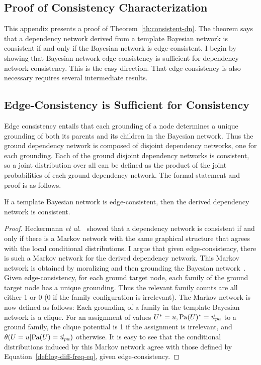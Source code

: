 \documentclass{sfuthesis}
\begin{document}
\begin{appendices} %
\chapter{ Proof of Consistency Characterization}

This appendix presents a proof of Theorem~\ref{th:consistent-dn}. The theorem says that a dependency network derived from a template Bayesian network is consistent if and only if the Bayesian network is edge-consistent. I  begin by showing that Bayesian network edge-consistency is sufficient for dependency network consistency. This is the easy direction. That edge-consistency is also necessary requires several intermediate results.

\section{Edge-Consistency is Sufficient for Consistency}

Edge consistency entails that each grounding of a node determines a unique grounding of both its parents and its children in the Bayesian network. Thus the ground dependency network is composed of disjoint dependency networks, one for each grounding. Each of the ground disjoint dependency networks is consistent, so a joint distribution over all can be defined as the product of the joint probabilities of each ground dependency network. The formal statement and proof is as follows.

\begin{proposition}
If a template Bayesian network is edge-consistent, then the derived dependency network is consistent.
\end{proposition}

\begin{proof} Heckermann {\em et al.}~\cite{Heckerman2000} showed that a dependency network is consistent if and only if there is a Markov network with the same graphical structure that agrees with the local conditional distributions. I  argue that given edge-consistency, there is such a Markov network for the derived dependency network. This Markov network  is obtained by moralizing and then grounding the Bayesian network~\cite{Domingos2009}. Given edge-consistency, for each ground target node, each family of the ground target node has a unique grounding. Thus the relevant family counts are all either 1 or 0 (0 if the family configuration is irrelevant). The Markov network is now defined as follows: Each grounding of a family in the template Bayesian network is a clique. For an assignment of values $\FG{\UT} = \UV,\FG{\Pa{\UT}} = \Prange{\UT}$ to a ground family, the clique potential is 1 if the assignment is irrelevant, and $\cprob{\UT = \UV}{\Pa{\UT} = \Prange{\UT}}$ otherwise. It is easy to see that the conditional distributions induced by this Markov network agree with those defined by Equation~\ref{def:log-diff-freq-eq}, given edge-consistency.
\end{proof}


\end{appendices}
\end{document}

